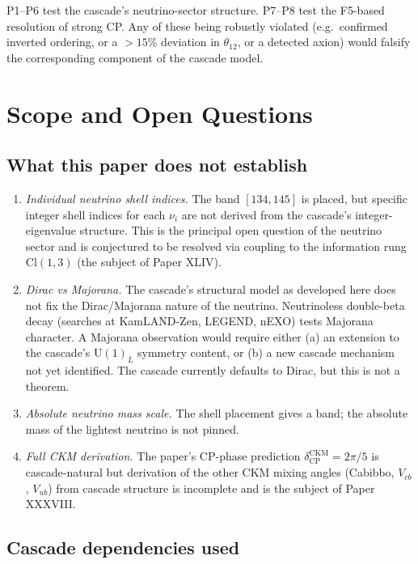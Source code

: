 \documentclass[12pt]{article}
\theoremstyle{definition}
\theoremstyle{remark}
\begin{document}
P1--P6 test the cascade's neutrino-sector structure. P7--P8 test the F5-based resolution of strong CP. Any of these being robustly violated (e.g.\ confirmed inverted ordering, or a $> 15\%$ deviation in $\theta_{12}$, or a detected axion) would falsify the corresponding component of the cascade model.

\section{Scope and Open Questions}\label{sec:scope}

\subsection{What this paper does not establish}

\begin{enumerate}
\item \emph{Individual neutrino shell indices.} The band $[134, 145]$ is placed, but specific integer shell indices for each $\nu_i$ are not derived from the cascade's integer-eigenvalue structure. This is the principal open question of the neutrino sector and is conjectured to be resolved via coupling to the information rung $\mathrm{Cl}(1,3)$ (the subject of Paper XLIV).
\item \emph{Dirac vs Majorana.} The cascade's structural model as developed here does not fix the Dirac/Majorana nature of the neutrino. Neutrinoless double-beta decay (searches at KamLAND-Zen, LEGEND, nEXO) tests Majorana character. A Majorana observation would require either (a) an extension to the cascade's U$(1)_L$ symmetry content, or (b) a new cascade mechanism not yet identified. The cascade currently defaults to Dirac, but this is not a theorem.
\item \emph{Absolute neutrino mass scale.} The shell placement gives a band; the absolute mass of the lightest neutrino is not pinned.
\item \emph{Full CKM derivation.} The paper's CP-phase prediction $\delta_{\mathrm{CP}}^{\mathrm{CKM}} = 2\pi/5$ is cascade-natural but derivation of the other CKM mixing angles (Cabibbo, $V_{cb}$, $V_{ub}$) from cascade structure is incomplete and is the subject of Paper XXXVIII.
\end{enumerate}

\subsection{Cascade dependencies used}
\end{document}
